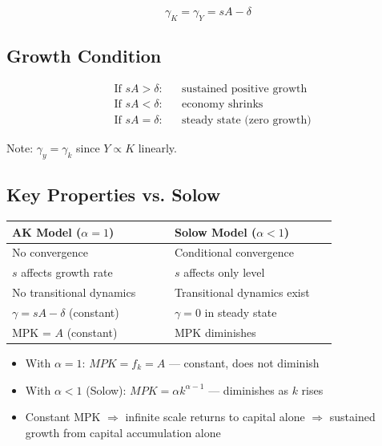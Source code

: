 \documentclass[a4paper,11pt]{article}
\begin{document}
\begin{resultbox}
\[
\boxed{\gamma_K = \gamma_Y = sA - \delta}
\tag{AK-Growth}
\]
\end{resultbox}

\subsection{Growth Condition}

\begin{align*}
&\text{If } sA > \delta: && \text{sustained positive growth} \\
&\text{If } sA < \delta: && \text{economy shrinks} \\
&\text{If } sA = \delta: && \text{steady state (zero growth)}
\end{align*}

Note: $\gamma_y = \gamma_k$ since $Y \propto K$ linearly.

\subsection{Key Properties vs. Solow}

\begin{center}
\begin{tabular}{p{0.45\linewidth}p{0.45\linewidth}}
\toprule
\textbf{AK Model ($\alpha = 1$)} & \textbf{Solow Model ($\alpha < 1$)} \\
\midrule
No convergence & Conditional convergence \\
$s$ affects growth rate & $s$ affects only level \\
No transitional dynamics & Transitional dynamics exist \\
$\gamma = sA - \delta$ (constant) & $\gamma = 0$ in steady state \\
MPK = $A$ (constant) & MPK diminishes \\
\bottomrule
\end{tabular}
\end{center}

\begin{tcolorbox}[colback=yellow!10,colframe=yellow!60,title=Why No Diminishing Returns Matters]
\begin{itemize}
    \item With $\alpha = 1$: $MPK = f_k = A$ — constant, does not diminish
    \item With $\alpha < 1$ (Solow): $MPK = \alpha k^{\alpha-1}$ — diminishes as $k$ rises
    \item Constant MPK $\Rightarrow$ infinite scale returns to capital alone
    $\Rightarrow$ sustained growth from capital accumulation alone
\end{itemize}
\end{tcolorbox}
\end{document}
